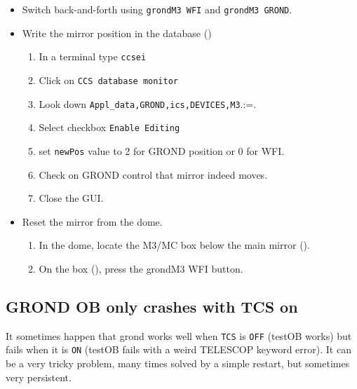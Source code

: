 \documentclass[11pt,fleqn,a4paper]{book}
\makeatletter
\def\menu#1#2{\texttt{#1}\ifx{}#2\else\@for\@x:=#2\do{$\rightarrow$\texttt{\@x}}\fi}
\makeatother
\begin{document}
\begin{itemize}
  \item Switch back-and-forth using \texttt{\gls{grondM3} WFI} and \texttt{\gls{grondM3} GROND}.
  \item Write the mirror position in the database ()
    \begin{enumerate}
      \item In a terminal type \texttt{ccsei}
      \item Click on \texttt{CCS database monitor} 
      \item Look down \menu{Appl\_data,GROND,\gls{ics},DEVICES,\gls{M3}}.
      \item Select checkbox \texttt{Enable Editing}
      \item set \texttt{newPos} value to 2 for GROND position or 0 for WFI.
      \item Check on GROND control that mirror indeed moves.
      \item Close the GUI.
    \end{enumerate}
  \item Reset the mirror from the dome.
    \begin{enumerate}
       \item In the \gls{dome}, locate the \gls{M3}/MC box below the \gls{main mirror} ().
       \item On the box (), press the \gls{grondM3} WFI button.
    \end{enumerate}
\end{itemize}

\subsection{GROND OB only crashes with TCS on}

It sometimes happen that \gls{grond} works well when \texttt{TCS} is \texttt{OFF} (testOB works) but fails when it is \texttt{ON} (testOB fails with a weird TELESCOP keyword error). It can be a very tricky problem, many times solved by a simple restart, but sometimes very persistent. 
\end{document}
